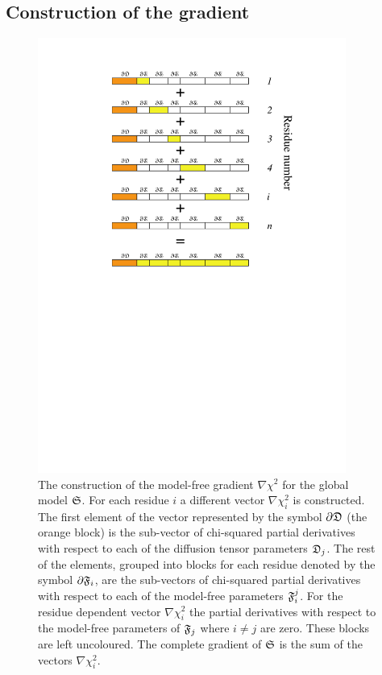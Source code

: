 
\subsection{Construction of the gradient}

\begin{figure}
\centerline{\includegraphics[width=0.9\textwidth, bb=143 399 494 777]{images/gradient}}
\caption[The construction of the model-free gradient.]{The construction of the model-free gradient $\nabla \chi^2$ for the global model $\mathfrak{S}$.  For each residue $i$ a different vector $\nabla \chi^2_i$ is constructed.  The first element of the vector represented by the symbol $\partial \mathfrak{D}$ (the orange block) is the sub-vector of chi-squared partial derivatives with respect to each of the diffusion tensor parameters $\mathfrak{D}_j$.  The rest of the elements, grouped into blocks for each residue denoted by the symbol $\partial \mathfrak{F}_i$, are the sub-vectors of chi-squared partial derivatives with respect to each of the model-free parameters $\mathfrak{F}_i^j$.  For the residue dependent vector $\nabla \chi^2_i$ the partial derivatives with respect to the model-free parameters of $\mathfrak{F}_j$ where $i \ne j$ are zero.  These blocks are left uncoloured.  The complete gradient of $\mathfrak{S}$ is the sum of the vectors $\nabla \chi^2_i$.}\label{fig: gradient construction}
\end{figure}

